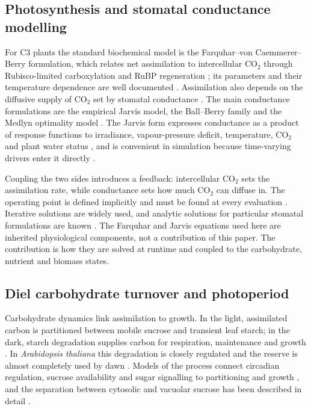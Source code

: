 \subsection{Photosynthesis and stomatal conductance modelling}

For C3 plants the standard biochemical model is the
Farquhar--von Caemmerer--Berry formulation, which relates net assimilation to
intercellular CO$_2$ through Rubisco-limited carboxylation and RuBP regeneration
\cite{Farquhar1980,vonCaemmerer2000}; its parameters and their temperature
dependence are well documented \cite{Sharkey2007,Bernacchi2001,Dubois2007}.
Assimilation also depends on the diffusive supply of CO$_2$ set by stomatal
conductance \cite{Lawson2014}. The main conductance formulations are the
empirical Jarvis model, the Ball--Berry family and the Medlyn optimality model
\cite{Jarvis1976,Ball1987,Medlyn2011}. The Jarvis form expresses conductance as
a product of response functions to irradiance, vapour-pressure deficit,
temperature, CO$_2$ and plant water status \cite{Jarvis1976,YU2017,Yu2021}, and
is convenient in simulation because time-varying drivers enter it directly
\cite{Damour2010,Buckley2017}.

Coupling the two sides introduces a feedback: intercellular CO$_2$ sets the
assimilation rate, while conductance sets how much CO$_2$ can diffuse in. The
operating point is defined implicitly and must be found at every evaluation
\cite{Damour2010}. Iterative solutions are widely used, and analytic solutions
for particular stomatal formulations are known \cite{Buckley2017,Kim2003}. The
Farquhar and Jarvis equations used here are inherited physiological components,
not a contribution of this paper. The contribution is how they are solved at
runtime and coupled to the carbohydrate, nutrient and biomass states.

\subsection{Diel carbohydrate turnover and photoperiod}

Carbohydrate dynamics link assimilation to growth. In the light, assimilated
carbon is partitioned between mobile sucrose and transient leaf starch; in the
dark, starch degradation supplies carbon for respiration, maintenance and
growth \cite{Stitt2012,Smith2007}. In \textit{Arabidopsis thaliana} this
degradation is closely regulated and the reserve is almost completely used by
dawn \cite{Graf2010,Scialdone2013,Webb2015}. Models of the process connect
circadian regulation, sucrose availability and sugar signalling to partitioning
and growth \cite{Feugier2013,Seki2017}, and the separation between cytosolic and
vacuolar sucrose has been described in detail \cite{Lohaus2000,Nadwodnik2008}.


